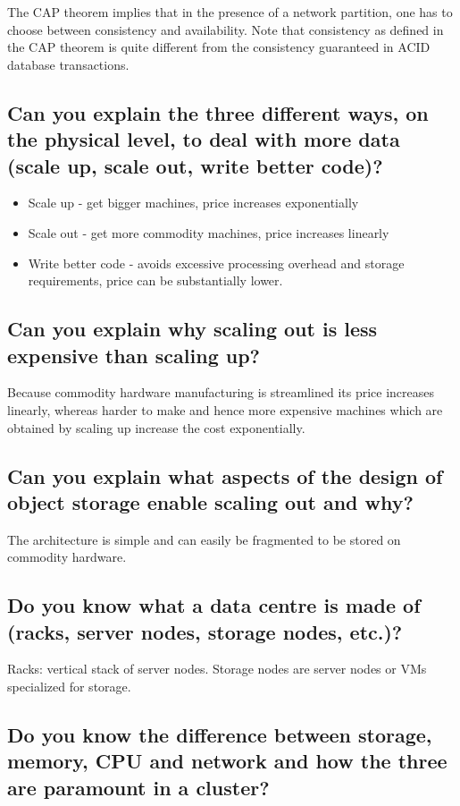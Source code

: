 \documentclass{article}
\begin{document}
The CAP theorem implies that in the presence of a network partition, one has to choose between consistency and availability. Note that consistency as defined in the CAP theorem is quite different from the consistency guaranteed in ACID database transactions.

\subsection{Can you explain the three different ways, on the physical level, to deal with more data (scale up, scale out, write better code)?}

\begin{itemize}
\item Scale up - get bigger machines, price increases exponentially
\item Scale out - get more commodity machines, price increases linearly
\item Write better code - avoids excessive processing overhead and storage requirements, price can be substantially lower.
\end{itemize}

\subsection{Can you explain why scaling out is less expensive than scaling up?}

Because commodity hardware manufacturing is streamlined its price increases linearly, whereas harder to make and hence more expensive machines which are obtained by scaling up increase the cost exponentially.

\subsection{Can you explain what aspects of the design of object storage enable scaling out and why?}

The architecture is simple and can easily be fragmented to be stored on commodity hardware.

\subsection{Do you know what a data centre is made of (racks, server nodes, storage nodes, etc.)?}

Racks: vertical stack of server nodes. Storage nodes are server nodes or VMs specialized for storage.

\subsection{Do you know the difference between storage, memory, CPU and network and how the three are paramount in a cluster?}
\end{document}
